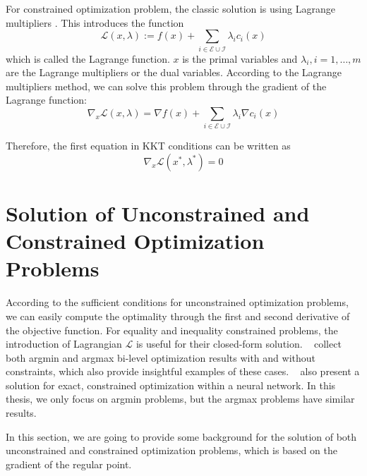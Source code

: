 \par For constrained optimization problem, the classic solution is using Lagrange multipliers \citep{BD:14}. This introduces the function 
$$
\mathscr{L}(x, \lambda):=f(x)+\sum_{i \in \mathscr{E} \cup \mathscr{I}} \lambda_{i} c_{i}(x)
$$
which is called the Lagrange function. $x$ is the primal variables and $\lambda_i, i=1, \dots, m$ are the Lagrange multipliers or the dual variables. According to the Lagrange multipliers method, we can solve this problem through the gradient of the Lagrange function: 
$$
\nabla_{x} \mathscr{L}(x, \lambda)=\nabla f(x)+\sum_{i \in \mathscr{E} \cup \mathscr{I}} \lambda_{i} \nabla c_{i}(x)
$$
\par Therefore, the first equation in KKT conditions can be written as
$$
\nabla_{x} \mathscr{L}\left(x^{*}, \lambda^{*}\right)=0
$$

\section{Solution of Unconstrained and Constrained Optimization Problems}
\label{sec:consopt}
According to the sufficient conditions for unconstrained optimization problems, we can easily compute the optimality through the first and second derivative of the objective function. For equality and inequality constrained problems, the introduction of Lagrangian $\mathcal{L}$ is useful for their closed-form solution. ~\cite{SG:16} collect both argmin and argmax bi-level optimization results with and without constraints, which also provide insightful examples of these cases. ~\cite{AB:17} also present a solution for exact, constrained optimization within a neural network. In this thesis, we only focus on argmin problems, but the argmax problems have similar results. 
\par In this section, we are going to provide some background for the solution of both unconstrained and constrained optimization problems, which is based on the gradient of the regular point. 

